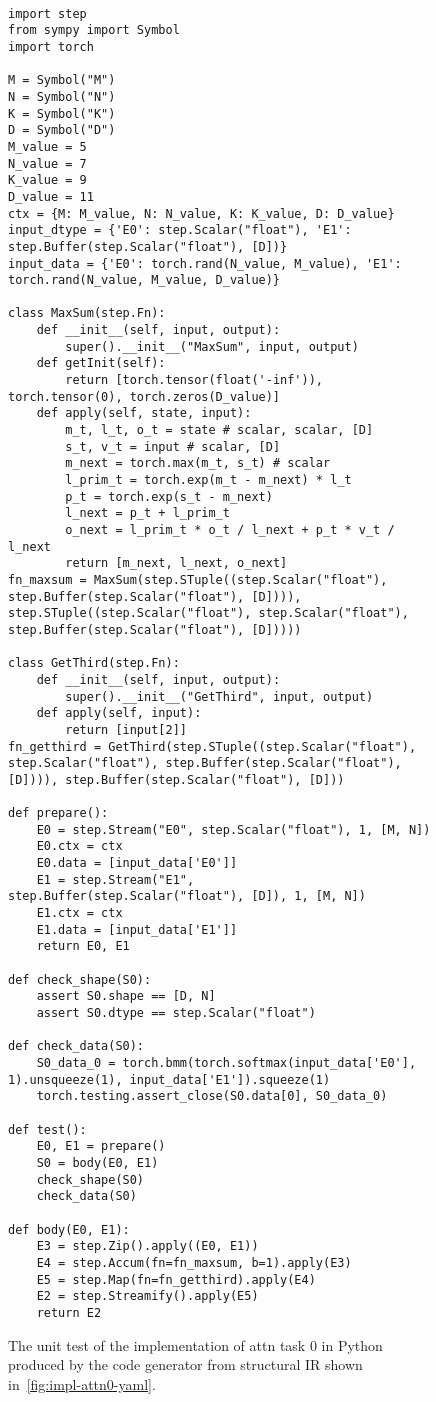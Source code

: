 \begin{figure}[htbp]
\centering
\begin{lstlisting}[language=step, mathescape=true, basicstyle=\scriptsize\ttfamily]

import step
from sympy import Symbol
import torch

M = Symbol("M")
N = Symbol("N")
K = Symbol("K")
D = Symbol("D")
M_value = 5
N_value = 7
K_value = 9
D_value = 11
ctx = {M: M_value, N: N_value, K: K_value, D: D_value}
input_dtype = {'E0': step.Scalar("float"), 'E1': step.Buffer(step.Scalar("float"), [D])}
input_data = {'E0': torch.rand(N_value, M_value), 'E1': torch.rand(N_value, M_value, D_value)}

class MaxSum(step.Fn):
    def __init__(self, input, output):
        super().__init__("MaxSum", input, output)
    def getInit(self):
        return [torch.tensor(float('-inf')), torch.tensor(0), torch.zeros(D_value)]
    def apply(self, state, input):
        m_t, l_t, o_t = state # scalar, scalar, [D]
        s_t, v_t = input # scalar, [D]
        m_next = torch.max(m_t, s_t) # scalar
        l_prim_t = torch.exp(m_t - m_next) * l_t
        p_t = torch.exp(s_t - m_next)
        l_next = p_t + l_prim_t
        o_next = l_prim_t * o_t / l_next + p_t * v_t / l_next
        return [m_next, l_next, o_next]     
fn_maxsum = MaxSum(step.STuple((step.Scalar("float"), step.Buffer(step.Scalar("float"), [D]))), step.STuple((step.Scalar("float"), step.Scalar("float"), step.Buffer(step.Scalar("float"), [D]))))
    
class GetThird(step.Fn):
    def __init__(self, input, output):
        super().__init__("GetThird", input, output)    
    def apply(self, input):
        return [input[2]]
fn_getthird = GetThird(step.STuple((step.Scalar("float"), step.Scalar("float"), step.Buffer(step.Scalar("float"), [D]))), step.Buffer(step.Scalar("float"), [D]))
    
def prepare():
    E0 = step.Stream("E0", step.Scalar("float"), 1, [M, N])
    E0.ctx = ctx
    E0.data = [input_data['E0']]
    E1 = step.Stream("E1", step.Buffer(step.Scalar("float"), [D]), 1, [M, N])
    E1.ctx = ctx
    E1.data = [input_data['E1']]
    return E0, E1
    
def check_shape(S0):
    assert S0.shape == [D, N]
    assert S0.dtype == step.Scalar("float")
    
def check_data(S0):
    S0_data_0 = torch.bmm(torch.softmax(input_data['E0'], 1).unsqueeze(1), input_data['E1']).squeeze(1)
    torch.testing.assert_close(S0.data[0], S0_data_0)
    
def test():
    E0, E1 = prepare()
    S0 = body(E0, E1)
    check_shape(S0)
    check_data(S0)
    
def body(E0, E1):
    E3 = step.Zip().apply((E0, E1))
    E4 = step.Accum(fn=fn_maxsum, b=1).apply(E3)
    E5 = step.Map(fn=fn_getthird).apply(E4)
    E2 = step.Streamify().apply(E5)
    return E2

\end{lstlisting}
\caption{The unit test of the implementation of attn task 0 in Python produced by the code generator from structural IR shown in~\cref{fig:impl-attn0-yaml}.}
\label{fig:impl-attn0-python}
\end{figure}



